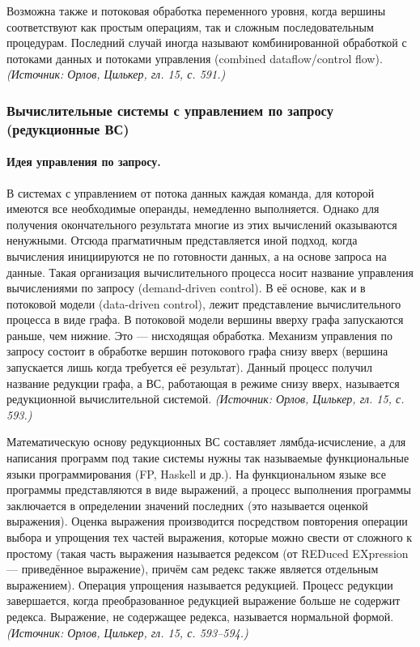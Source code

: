 \documentclass[a4paper,12pt]{article}
\begin{document}
Возможна также и потоковая обработка переменного уровня, когда вершины соответствуют как простым операциям, так и сложным последовательным процедурам. Последний случай иногда называют комбинированной обработкой с потоками данных и потоками управления (combined dataflow/control flow).
\textit{(Источник: Орлов, Цилькер, гл. 15, с. 591.)}

\subsubsection{Вычислительные системы с управлением по запросу (редукционные ВС)}

\paragraph{Идея управления по запросу.}
В системах с управлением от потока данных каждая команда, для которой имеются все необходимые операнды, немедленно выполняется. Однако для получения окончательного результата многие из этих вычислений оказываются ненужными. Отсюда прагматичным представляется иной подход, когда вычисления инициируются не по готовности данных, а на основе запроса на данные. Такая организация вычислительного процесса носит название управления вычислениями по запросу (demand-driven control). В её основе, как и в потоковой модели (data-driven control), лежит представление вычислительного процесса в виде графа. В потоковой модели вершины вверху графа запускаются раньше, чем нижние. Это — нисходящая обработка. Механизм управления по запросу состоит в обработке вершин потокового графа снизу вверх (вершина запускается лишь когда требуется её результат). Данный процесс получил название редукции графа, а ВС, работающая в режиме снизу вверх, называется редукционной вычислительной системой.
\textit{(Источник: Орлов, Цилькер, гл. 15, с. 593.)}

Математическую основу редукционных ВС составляет лямбда-исчисление, а для написания программ под такие системы нужны так называемые функциональные языки программирования (FP, Haskell и др.). На функциональном языке все программы представляются в виде выражений, а процесс выполнения программы заключается в определении значений последних (это называется оценкой выражения). Оценка выражения производится посредством повторения операции выбора и упрощения тех частей выражения, которые можно свести от сложного к простому (такая часть выражения называется редексом (от REDuced EXpression — приведённое выражение), причём сам редекс также является отдельным выражением). Операция упрощения называется редукцией. Процесс редукции завершается, когда преобразованное редукцией выражение больше не содержит редекса. Выражение, не содержащее редекса, называется нормальной формой.
\textit{(Источник: Орлов, Цилькер, гл. 15, с. 593--594.)}
\end{document}
